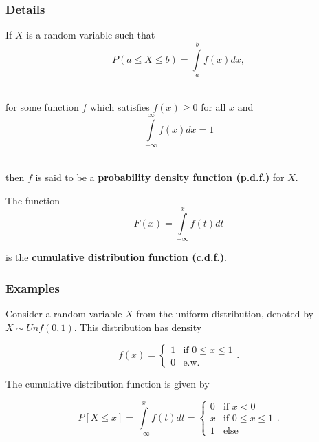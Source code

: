 \documentclass[12pt,a4paper]{article}
\theoremstyle{regla}
\theoremstyle{remark}
\theoremstyle{definition}
\theoremstyle{nonumberbreak}
\begin{document}
\subsubsection{Details}
\begin{defn}
If $X$ is a random variable such that \\
$$P(a\leq X\leq b)=\int\limits^{b}_{a}f(x)dx,$$

\\
for some function $f$ which satisfies $f(x)\geq0$ for all $x$ and\\
$$\int\limits^\infty_{-\infty} f(x)dx = 1$$

\\
then $f$ is said to be a {\bf probability density function (p.d.f.)} for $X$.
\end{defn}
\begin{defn}
The function
$$ F(x)= \int\limits^{x}_{-\infty} f(t)dt$$

is the {\bf cumulative distribution function (c.d.f.)}. 
\end{defn}
\subsubsection{Examples}
\begin{xmpl}
Consider a random variable $X$ from the uniform distribution, denoted by $X\sim Unf(0,1)$.  This distribution has density

$$
f(x) = 
\begin{cases}
  1 &\text{if } 0 \leq x \leq 1\\
  0 &\text{e.w.}
\end{cases}.
$$

The cumulative distribution function is given by

$$
P[X\leq x] = \int\limits^{x}_{-\infty} f(t)dt = 
\begin{cases}
  0 & \text{if } x<0\\
  x & \text{if } 0 \leq x \leq 1\\
  1 & \text{else}
\end{cases}.
$$

\end{xmpl}
\end{document}
